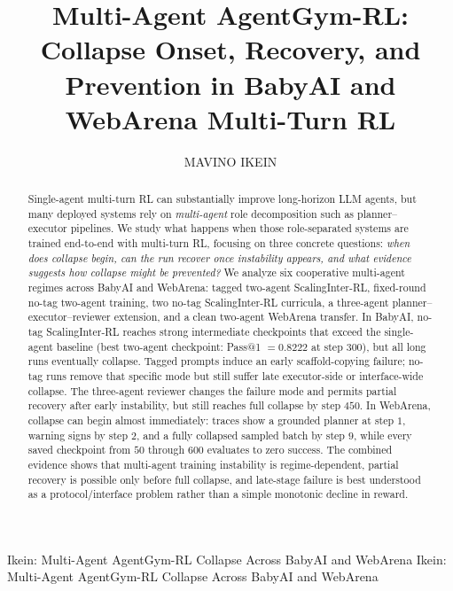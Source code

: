 \documentclass{ieeeaccess}
\begin{document}

\title{Multi-Agent AgentGym-RL: Collapse Onset, Recovery, and Prevention in BabyAI and WebArena Multi-Turn RL}
\author{\uppercase{Mavino Ikein}}
\address{Georgia Institute of Technology, Atlanta, GA, USA (e-mail: mikein3@gatech.edu)}

\markboth
{Ikein: Multi-Agent AgentGym-RL Collapse Across BabyAI and WebArena}
{Ikein: Multi-Agent AgentGym-RL Collapse Across BabyAI and WebArena}

\begin{abstract}
Single-agent multi-turn RL can substantially improve long-horizon LLM agents, but many deployed systems rely on \emph{multi-agent} role decomposition such as planner--executor pipelines. We study what happens when those role-separated systems are trained end-to-end with multi-turn RL, focusing on three concrete questions: \emph{when does collapse begin, can the run recover once instability appears, and what evidence suggests how collapse might be prevented?} We analyze six cooperative multi-agent regimes across BabyAI and WebArena: tagged two-agent ScalingInter-RL, fixed-round no-tag two-agent training, two no-tag ScalingInter-RL curricula, a three-agent planner--executor--reviewer extension, and a clean two-agent WebArena transfer. In BabyAI, no-tag ScalingInter-RL reaches strong intermediate checkpoints that exceed the single-agent baseline (best two-agent checkpoint: Pass@1 $=0.8222$ at step $300$), but all long runs eventually collapse. Tagged prompts induce an early scaffold-copying failure; no-tag runs remove that specific mode but still suffer late executor-side or interface-wide collapse. The three-agent reviewer changes the failure mode and permits partial recovery after early instability, but still reaches full collapse by step $450$. In WebArena, collapse can begin almost immediately: traces show a grounded planner at step $1$, warning signs by step $2$, and a fully collapsed sampled batch by step $9$, while every saved checkpoint from $50$ through $600$ evaluates to zero success. The combined evidence shows that multi-agent training instability is regime-dependent, partial recovery is possible only before full collapse, and late-stage failure is best understood as a protocol/interface problem rather than a simple monotonic decline in reward.
\end{abstract}
\end{document}

